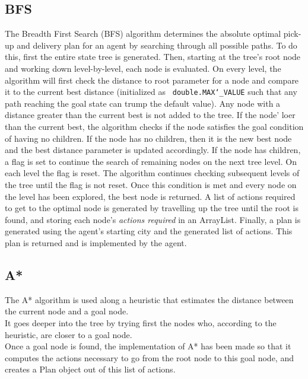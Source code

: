 \documentclass[11pt]{article}
\begin{document}
\subsection{BFS}
The Breadth First Search (BFS) algorithm determines the absolute optimal pick-up and delivery plan for an agent by searching through all possible paths. To do this, first the entire state tree is generated. Then, starting at the tree's root node and working down level-by-level, each node is evaluated. On every level, the algorithm will first check the distance to root parameter for a node and compare it to the current best distance (initialized as \texttt{ double.MAX\char`_VALUE} such that any path reaching the goal state can trump the default value). Any node with a distance greater than the current best is not added to the tree. If the node' loer than the current best, the algorithm checks if the node satisfies the goal condition of having no children. If the node has no children, then it is the new best node and the best distance parameter is updated accordingly. If the node has children, a flag is set to continue the search of remaining nodes on the next tree level. On each level the flag is reset. The algorithm continues checking subsequent levels of the tree until the flag is not reset. Once this condition is met and every node on the level has been explored, the best node is returned. A list of actions required to get to the optimal node is generated by travelling up the tree until the root is found, and storing each node's \textit{actions required} in an ArrayList. Finally, a plan is generated using the agent's starting city and the generated list of actions. This plan is returned and is implemented by the agent. 
\subsection{A*}
The A* algorithm is used along a heuristic that estimates the distance between the current node and a goal node.\\

It goes deeper into the tree by trying first the nodes who, according to the heuristic, are closer to a goal node.\\

Once a goal node is found, the implementation of A* has been made so that it computes the actions necessary to go from the root node to this goal node, and creates a Plan object out of this list of actions.\\
\end{document}
